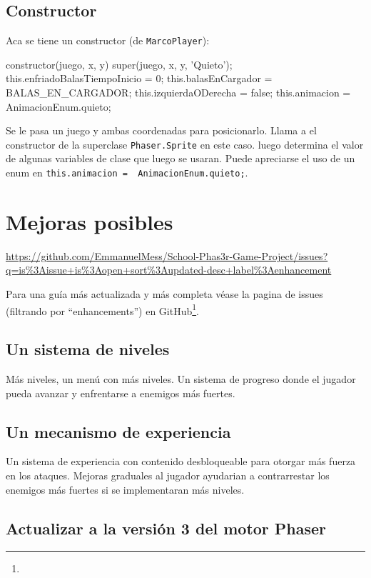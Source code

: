 \documentclass{article}
\newcommand{\insertverbbox}{{\addvbuffer[6pt 3pt]{\theverbbox}\par}}
\begin{document}
	\subsection*{Constructor}
	Aca se tiene un constructor (de \verb|MarcoPlayer|):
	 
	 \begin{verbbox}
		constructor(juego, x, y) {
		    super(juego, x, y, 'Quieto');
		    this.enfriadoBalasTiempoInicio = 0;
		    this.balasEnCargador = BALAS_EN_CARGADOR;
	   	    this.izquierdaODerecha = false;
		    this.animacion = AnimacionEnum.quieto;
		}
	 \end{verbbox}
	 \insertverbbox
	 
	 Se le pasa un juego y ambas coordenadas para posicionarlo. Llama a el constructor de la superclase \verb|Phaser.Sprite| en este caso. luego determina el valor de algunas variables de clase que luego se usaran. Puede apreciarse el uso de un enum en \verb|this.animacion =  AnimacionEnum.quieto;|.
    
   	\section*{Mejoras posibles}
   	\urldef\inserturl\url{https://github.com/EmmanuelMess/School-Phas3r-Game-Project/issues?q=is%3Aissue+is%3Aopen+sort%3Aupdated-desc+label%3Aenhancement}
   		
	Para una guía más actualizada y más completa véase la pagina de issues (filtrando por ``enhancements'') en GitHub\footnote{\inserturl}.
	
   	\subsection*{Un sistema de niveles}
	
	Más niveles, un menú con más niveles. Un sistema de progreso donde el jugador pueda avanzar y enfrentarse a enemigos más fuertes.
	
	\subsection*{Un mecanismo de experiencia}
	
	Un sistema de experiencia con contenido desbloqueable para otorgar más fuerza en los ataques. Mejoras graduales al jugador ayudarian a contrarrestar los enemigos más fuertes si se implementaran más niveles.
	
	\subsection*{Actualizar a la versión 3 del motor Phaser}
	
\end{document}
